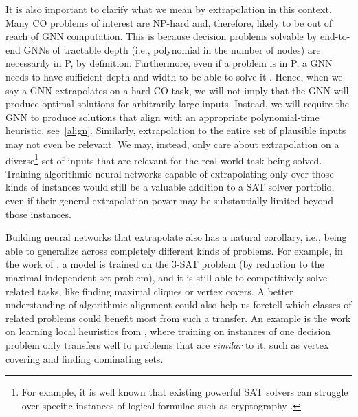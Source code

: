 \documentclass[twoside,11pt]{article}
\newcommand{\cm}[1]{{{\textcolor{orange}{\textbf{[CM:} {#1}\textbf{]}}}}}
\begin{document}
It is also important to clarify what we mean by extrapolation in this context. Many CO problems of interest are \textsf{NP}-hard and, therefore, likely to be out of reach of GNN computation. This is because decision problems solvable by end-to-end GNNs of tractable depth (i.e., polynomial in the number of nodes) are necessarily in \textsf{P}, by definition. Furthermore, even if a problem is in \textsf{P}, a GNN needs to have sufficient depth and width to be able to solve it \citep{Loukas2020}. Hence, when we say a GNN extrapolates on a hard CO task, we will not imply that the GNN will produce optimal solutions for arbitrarily large inputs. Instead, we will require the GNN to produce solutions that align with an appropriate polynomial-time heuristic, see~\cref{align}. Similarly, extrapolation to the entire set of plausible inputs may not even be relevant. We may, instead, only care about extrapolation on a diverse\footnote{For example, it is well known that existing powerful SAT solvers can struggle over specific instances of logical formulae such as cryptography \citep{ganesh2020unreasonable}.} set of inputs that are relevant for the real-world task being solved. Training algorithmic neural networks capable of extrapolating only over those kinds of instances would still be a valuable addition to a SAT solver portfolio, even if their general extrapolation power may be substantially limited beyond those instances.

Building neural networks that extrapolate also has a natural corollary, i.e., being able to generalize across completely different kinds of problems. For example, in the work of \citep{li2018combinatorial}, a model is trained on the 3-SAT problem (by reduction to the maximal independent set problem), and it is still able to competitively solve related tasks, like finding maximal cliques or vertex covers. A better understanding of algorithmic alignment could also help us foretell which classes of related problems could benefit most from such a transfer. An example is the work on learning local heuristics from \citet{yolcu2019learning}, where training on instances of one decision problem only transfers well to problems that are \emph{similar} to it, such as vertex covering and finding dominating sets.

\end{document}
